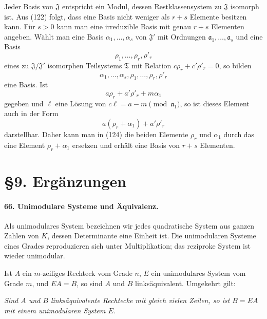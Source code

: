 \documentclass[11pt]{article}
\begin{document}
Jeder Basis von $\mathfrak J$ entspricht ein Modul, dessen Restklassensystem zu $\mathfrak J$ isomorph ist. Aus (122) folgt, dass eine Basis nicht weniger als $r+s$ Elemente besitzen kann. Für $s>0$ kann man eine irreduzible Basis mit genau $r+s$ Elementen angeben. Wählt man eine Basis $\alpha_1,
\ldots,
\alpha_s$ von $\mathfrak J'$ mit Ordnungen $\mathfrak a_1,
\ldots,
\mathfrak a_s$ und eine Basis
\[
  \rho_1,
\ldots,
\rho_r,
\rho'_r
\]
eines zu $\mathfrak J/\mathfrak J'$ isomorphen Teilsystems $\mathfrak T$ mit Relation $c\rho_r+c'\rho'_r=0$, so bilden
\begin{equation}
  \alpha_1,
\ldots,
\alpha_s,
\rho_1,
\ldots,
\rho_r,
\rho'_r
\tag{124}
\end{equation}
eine Basis. Ist
\begin{equation}
  a\rho_r+a'\rho'_r+m\alpha_1
\tag{125}
\end{equation}
gegeben und $\ell$ eine Lösung von $c\ell=a-m\pmod{\mathfrak a_1}$, so ist dieses Element auch in der Form
\[
  a(\rho_r+\alpha_1)+a'\rho'_r
\]
darstellbar. Daher kann man in (124) die beiden Elemente $\rho_r$ und $\alpha_1$ durch das eine Element $\rho_r+\alpha_1$ ersetzen und erhält eine Basis von $r+s$ Elementen.

\section*{\S 9. Ergänzungen}

\paragraph{66. Unimodulare Systeme und Äquivalenz.}
Als unimodulares System bezeichnen wir jedes quadratische System aus ganzen Zahlen von $K$, dessen Determinante eine Einheit ist. Die unimodularen Systeme eines Grades reproduzieren sich unter Multiplikation; das reziproke System ist wieder unimodular.

Ist $A$ ein $m$-zeiliges Rechteck vom Grade $n$, $E$ ein unimodulares System vom Grade $m$, und $EA=B$, so sind $A$ und $B$ linksäquivalent. Umgekehrt gilt:

\emph{Sind $A$ und $B$ linksäquivalente Rechtecke mit gleich vielen Zeilen, so ist $B=EA$ mit einem unimodularen System $E$.}
\end{document}

